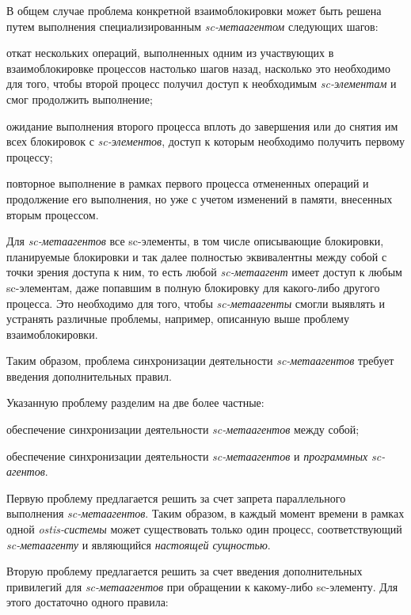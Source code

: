 В общем случае проблема конкретной взаимоблокировки может быть решена путем выполнения специализированным \textit{sc-метаагентом} следующих шагов:	
\begin{textitemize}
	\item откат нескольких операций, выполненных одним из участвующих в взаимоблокировке процессов настолько шагов назад, насколько это необходимо для того, чтобы второй процесс получил доступ к необходимым \textit{sc-элементам} и смог продолжить выполнение;
	\item ожидание выполнения второго процесса вплоть до завершения или до снятия им всех блокировок с \textit{sc-элементов}, доступ к которым необходимо получить первому процессу;
	\item повторное выполнение в рамках первого процесса отмененных операций и продолжение его выполнения, но уже с учетом изменений в памяти, внесенных вторым процессом.		
\end{textitemize}

Для \textit{sc-метаагентов} все sc-элементы, в том числе описывающие блокировки, планируемые блокировки и так далее полностью эквивалентны между собой с точки зрения доступа к ним, то есть любой \textit{sc-метаагент} имеет доступ к любым sc-элементам, даже попавшим в полную блокировку для какого-либо другого процесса. Это необходимо для того, чтобы \textit{sc-метаагенты} смогли выявлять и устранять различные проблемы, например, описанную выше проблему взаимоблокировки.

Таким образом, проблема синхронизации деятельности \textit{sc-метаагентов} требует введения дополнительных правил.

Указанную проблему разделим на две более частные:
\begin{textitemize}
	\item обеспечение синхронизации деятельности \textit{sc-метаагентов} между собой;
	\item обеспечение синхронизации деятельности \textit{sc-метаагентов} и \textit{программных sc-агентов}.		
\end{textitemize}

Первую проблему предлагается решить за счет запрета параллельного выполнения \textit{sc-метаагентов}. Таким образом, в каждый момент времени в рамках одной \textit{ostis-системы} может существовать только один процесс, соответствующий \textit{sc-метаагенту} и являющийся \textit{настоящей сущностью}. 

Вторую проблему предлагается решить за счет введения дополнительных привилегий для \textit{sc-метаагентов} при обращении к какому-либо sc-элементу. Для этого достаточно одного правила: 

